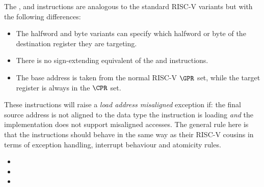 
The ,  and  instructions are analogous to
the standard RISC-V variants but with the following differences:

\begin{itemize}
\item The halfword and byte variants can specify which halfword or byte of
      the destination register they are targeting.
\item There is no sign-extending equivalent of the  and 
      instructions.
\item The base address is taken from the normal RISC-V $\GPR$ set, while the
      target register is always in the $\CPR$ set.
\end{itemize}

These instructions will raise a {\em load address misaligned} exception
if: the final source address is not aligned to the data type the instruction
is loading {\em and} the implementation does not support misaligned accesses.
The general rule here is that the  instructions should behave in
the same way as their RISC-V cousins in terms of exception handling,
interrupt behaviour and atomicity rules.

\begin{itemize}
\item {}
\item {}
\item {}
\end{itemize}

